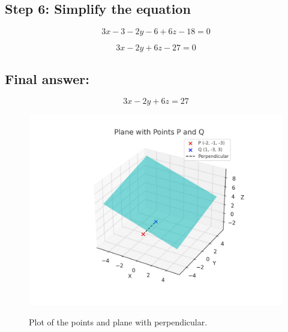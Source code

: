 \documentclass[journal]{IEEEtran}
\begin{document}
\subsection*{\textbf{Step 6}: Simplify the equation}
\[
3x - 3 - 2y - 6 + 6z - 18 = 0
\]

\[
3x - 2y + 6z - 27 = 0
\]

\subsection*{\textbf{Final answer:}}
\[
\boxed{3x - 2y + 6z = 27}
\]


\begin{figure}[htbp]
\centering
\includegraphics[width=0.8\columnwidth]{figs/python_plot.png} 
\caption*{Plot of the points and plane with perpendicular.}
\label*{fig:1}
\end{figure}
\end{document}
